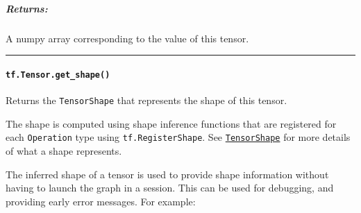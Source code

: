 \subparagraph{Returns: }\label{returns-20}

A numpy array corresponding to the value of this tensor.

\begin{center}\rule{0.5\linewidth}{\linethickness}\end{center}

\paragraph{\texorpdfstring{\lstinline{tf.Tensor.get_shape()}
}{tf.Tensor.get_shape() }}\label{tf.tensor.getux5fshape}

Returns the \lstinline{TensorShape} that represents the shape of this
tensor.

The shape is computed using shape inference functions that are
registered for each \lstinline{Operation} type using
\lstinline{tf.RegisterShape}. See
\href{../../api_docs/python/framework.md\#TensorShape}{\lstinline{TensorShape}}
for more details of what a shape represents.

The inferred shape of a tensor is used to provide shape information
without having to launch the graph in a session. This can be used for
debugging, and providing early error messages. For example:

\begin{Shaded}
\begin{Highlighting}[]
\OperatorTok{=} \NormalTok{tf.constant([[}\NormalTok{, }\NormalTok{, }\NormalTok{], [}\NormalTok{, }\NormalTok{, }\NormalTok{]])}

 
\OperatorTok{==>} \NormalTok{TensorShape([Dimension(}\NormalTok{)])}

\OperatorTok{=} \NormalTok{tf.constant([[}\NormalTok{, }\NormalTok{], [}\NormalTok{, }\NormalTok{], [}\NormalTok{, }\NormalTok{], [}\NormalTok{, }\NormalTok{]])}

 
\OperatorTok{==>} \NormalTok{TensorShape([Dimension(}\NormalTok{)])}

\OperatorTok{=} 

\OperatorTok{=} \OperatorTok{=}\OperatorTok{=}\NormalTok{)}

 
\OperatorTok{==>} \NormalTok{TensorShape([Dimension(}\NormalTok{)])}
\end{Highlighting}
\end{Shaded}

